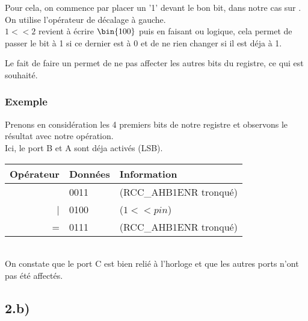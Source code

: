 Pour cela, on commence par placer un '1' devant le bon bit, dans notre cas sur . On utilise l'opérateur de décalage à gauche.\\



$1 << 2$ revient à écrire $\bin{100}$ puis en faisant ou  logique, cela permet de passer le bit à 1 si ce dernier est à 0 et de ne rien changer si il est déja à 1.


Le fait de faire un  permet de ne pas affecter les autres bits du registre, ce qui est souhaité. 

\subsubsection{Exemple}
Prenons en considération les 4 premiers bits de notre registre  et observons le résultat avec notre opération.\\
Ici, le port B et A sont déja activés (LSB).\\

\begin{tabular}{rl|l}
  Opérateur & Données & Information \\
\hline
    & 0011 & (RCC\_AHB1ENR tronqué)\\
   | & 0100 & ($1 << pin$)\\
   \hline
   = & 0111 & (RCC\_AHB1ENR tronqué)\\
  
\end{tabular} \\

On constate que le port C est bien relié à l'horloge et que les autres ports n'ont pas été affectés.

\subsection{2.b)}

